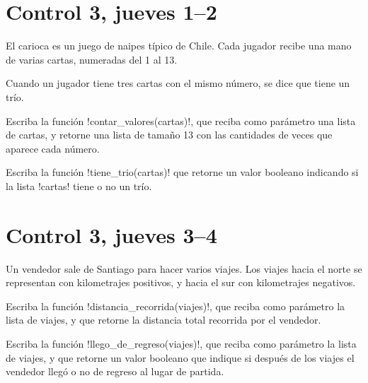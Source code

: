 \documentclass[12pt,spanish,a5paper,landscape]{article}
\begin{document}
  

  \newpage
  \part*{Control 3, jueves 1--2}
  \newpage
  El carioca es un juego de naipes típico de Chile.
  Cada jugador recibe una mano de varias cartas,
  numeradas del 1 al 13.

  Cuando un jugador tiene tres cartas con el mismo número,
  se dice que tiene un trío.

  Escriba la función \li!contar_valores(cartas)!,
  que reciba como parámetro una lista de cartas,
  y retorne una lista de tamaño 13
  con las cantidades de veces que aparece cada número.

  Escriba la función \li!tiene_trio(cartas)!
  que retorne un valor booleano
  indicando si la lista \li!cartas! tiene o no un trío.

  

  \newpage
  \part*{Control 3, jueves 3--4}
  \newpage

  Un vendedor sale de Santiago
  para hacer varios viajes.
  Los viajes hacia el norte
  se representan con kilometrajes positivos,
  y hacia el sur con kilometrajes negativos.

  Escriba la función \li!distancia_recorrida(viajes)!,
  que reciba como parámetro la lista de viajes,
  y que retorne la distancia total recorrida por el vendedor.

  Escriba la función \li!llego_de_regreso(viajes)!,
  que reciba como parámetro la lista de viajes,
  y que retorne un valor booleano
  que indique si después de los viajes
  el vendedor llegó o no de regreso al lugar de partida.

  
\end{document}
